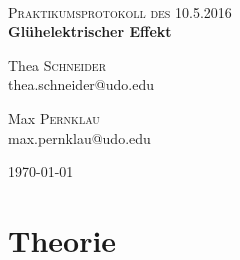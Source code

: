 

\newcommand{\HRule}{\rule{\linewidth}{0.5mm}}


\begin{titlepage}
\begin{center}

~\\[1cm]


\textsc{\Large Praktikumsprotokoll des 10.5.2016}\\

\huge{ \bfseries Glühelektrischer Effekt}\\[1em]


\begin{minipage}{0.4\textwidth}
\begin{flushleft} \large
Thea \textsc{Schneider}\\
thea.schneider@udo.edu
\end{flushleft}
\end{minipage}
\begin{minipage}{0.4\textwidth}
\begin{flushright} \large
Max \textsc{Pernklau}\\
max.pernklau@udo.edu
\end{flushright}
\end{minipage}

\vfill

{\large \today}

\end{center}
\end{titlepage}


\thispagestyle{empty}



\begingroup
\renewcommand{\clearpage}{}
\section{Theorie}
\label{sec:Theorie}
\endgroup









